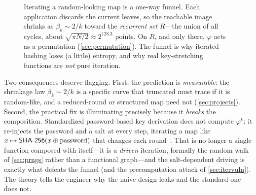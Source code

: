 \begin{figure}[ht]
  \centering
  \caption{Iterating a random-looking map is a one-way funnel. Each
  application discards the current leaves, so the reachable image shrinks
  as $\beta_{k}\sim 2/k$ toward the \emph{recurrent set} $R$---the union
  of all cycles, about $\sqrt{\pi N/2}\approx 2^{128.3}$ points. On $R$,
  and only there, $\varphi$ acts as a permutation (\cref{sec:permutation}).
  The funnel is why iterated hashing loses (a little) entropy, and why
  real key-stretching functions are \emph{not} pure iteration.}
  \label{fig:funnel}
\end{figure}

Two consequences deserve flagging. First, the prediction is
\emph{measurable}: the shrinkage law $\beta_{k}\sim 2/k$ is a specific
curve that truncated \SHA{} must trace if it is random-like, and a
reduced-round or structured map need not (\cref{sec:projects}). Second,
the practical fix is illuminating precisely because it \emph{breaks} the
composition. Standardized password-based key derivation does not compute
$\varphi^{k}$; it re-injects the password and a salt at every step,
iterating a map like $x \mapsto \textsf{SHA-256}(x \oplus \text{password})$ that
changes each round~\citep{NIST_SP800132}. That is no longer a single
function composed with itself---it is a \emph{driven} iteration, formally
the random walk of \cref{sec:prngs} rather than a functional graph---and
the salt-dependent driving is exactly what defeats the funnel (and the
precomputation attack of \cref{sec:itervuln}). The theory tells the
engineer why the naive design leaks and the standard one does not.

